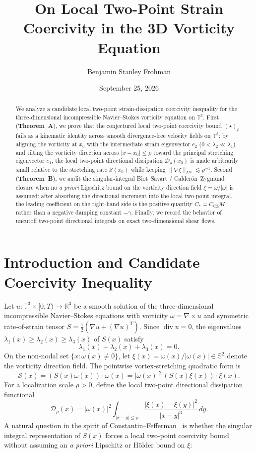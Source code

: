 \documentclass[11pt]{amsart}
\title[On Local Two-Point Strain Coercivity in the 3D Vorticity Equation]{On Local Two-Point Strain Coercivity in the 3D Vorticity Equation}
\author{Benjamin Stanley Frohman}
\date{September 25, 2026}
\theoremstyle{definition}
\begin{document}
\begin{abstract}
We analyze a candidate local two-point strain-dissipation coercivity inequality for the three-dimensional incompressible Navier--Stokes vorticity equation on $\mathbb{T}^3$. First (\textbf{Theorem~A}), we prove that the conjectured local two-point coercivity bound $(\star)_\rho$ fails as a kinematic identity across smooth divergence-free velocity fields on $\mathbb{T}^3$: by aligning the vorticity at $x_0$ with the intermediate strain eigenvector $e_2$ ($0<\lambda_2\ll \lambda_1$) and tilting the vorticity direction across $|x-x_0|\le\rho$ toward the principal stretching eigenvector $e_1$, the local two-point directional dissipation $\mathcal{D}_\rho(x_0)$ is made arbitrarily small relative to the stretching rate $\mathcal{S}(x_0)$ while keeping $\|\nabla\xi\|_{L^\infty}\lesssim\rho^{-1}$. Second (\textbf{Theorem~B}), we audit the singular-integral Biot--Savart / Calder\'on--Zygmund closure when no \emph{a priori} Lipschitz bound on the vorticity direction field $\xi=\omega/|\omega|$ is assumed: after absorbing the directional increment into the local two-point integral, the leading coefficient on the right-hand side is the positive quantity $C_*=C_{\mathrm{CZ}}M$ rather than a negative damping constant $-\gamma$. Finally, we record the behavior of uncutoff two-point directional integrals on exact two-dimensional shear flows.
\end{abstract}

\maketitle

\section{Introduction and Candidate Coercivity Inequality}

Let $u:\mathbb{T}^3\times[0,T)\to\mathbb{R}^3$ be a smooth solution of the three-dimensional incompressible Navier--Stokes equations with vorticity $\omega=\nabla\times u$ and symmetric rate-of-strain tensor $S=\tfrac{1}{2}(\nabla u+(\nabla u)^T)$. Since $\operatorname{div}u=0$, the eigenvalues $\lambda_1(x)\ge\lambda_2(x)\ge\lambda_3(x)$ of $S(x)$ satisfy
\[
  \lambda_1(x)+\lambda_2(x)+\lambda_3(x)=0.
\]
On the non-nodal set $\{x:\omega(x)\neq 0\}$, let $\xi(x)=\omega(x)/|\omega(x)|\in\mathbb{S}^2$ denote the vorticity direction field. The pointwise vortex-stretching quadratic form is
\[
  \mathcal{S}(x)=(S(x)\omega(x))\cdot\omega(x)=|\omega(x)|^2\,(S(x)\xi(x))\cdot\xi(x).
\]
For a localization scale $\rho>0$, define the local two-point directional dissipation functional
\[
  \mathcal{D}_\rho(x)=|\omega(x)|^2\int_{|x-y|\le\rho}\frac{|\xi(x)-\xi(y)|^2}{|x-y|^3}\,dy.
\]
A natural question in the spirit of Constantin--Fefferman~\cite{CF93} is whether the singular integral representation of $S(x)$ forces a local two-point coercivity bound without assuming an \emph{a priori} Lipschitz or H\"older bound on $\xi$:
\end{document}
